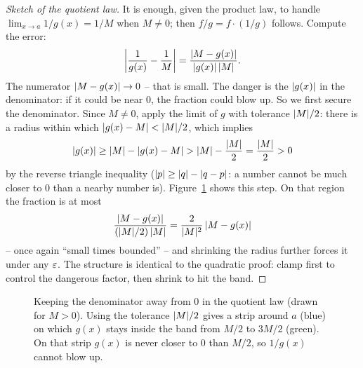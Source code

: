 \begin{proof}[Sketch of the quotient law]
It is enough, given the product law, to handle $\lim_{x\to a}1/g(x) = 1/M$
when $M\ne0$; then $f/g=f\cdot(1/g)$ follows. Compute the
error:
\[
  \left\lvert \frac{1}{g(x)} - \frac{1}{M} \right\rvert
  = \frac{\lvert M - g(x)\rvert}{\lvert g(x)\rvert\,\lvert M\rvert}.
\]
The numerator $\lvert M-g(x)\rvert\to0$ -- that is small. The danger is the
$\lvert g(x)\rvert$ in the denominator: if it could be near $0$, the fraction could blow
up. So we first secure the denominator. Since $M\ne0$, apply the limit of $g$
with tolerance $\lvert M\rvert/2$: there is a radius within which $\lvert g(x)-M\rvert <
\lvert M\rvert/2$, which implies
\[
  \lvert g(x)\rvert \ge \lvert M\rvert - \lvert g(x)-M\rvert > \lvert M\rvert - \frac{\lvert M\rvert}{2} = \frac{\lvert M\rvert}{2} > 0
\]
by the reverse triangle inequality ($\lvert p\rvert\ge\lvert q\rvert-\lvert q-p\rvert$: a number
cannot be much closer to $0$ than a nearby number is).
Figure~\ref{ch06:fig-quot-denom} shows this step. On that region the fraction is
at most
\[
  \frac{\lvert M-g(x)\rvert}{(\lvert M\rvert/2)\,\lvert M\rvert} = \frac{2}{\lvert M\rvert^2}\,\lvert M-g(x)\rvert
\]
-- once again ``small times bounded'' -- and
shrinking the radius further forces it under any $\varepsilon$. The structure is
identical to the quadratic proof: clamp first to control the dangerous factor,
then shrink to hit the band.
\end{proof}

\begin{figure}[htbp]
\centering
{}
\caption{Keeping the denominator away from $0$ in the quotient law (drawn for
$M>0$). Using the tolerance $\lvert M\rvert/2$ gives a strip around $a$ (blue) on which
$g(x)$ stays inside the band from $M/2$ to $3M/2$ (green). On that strip $g(x)$
is never closer to $0$ than $M/2$, so $1/g(x)$ cannot blow up.}
\label{ch06:fig-quot-denom}
\end{figure}

